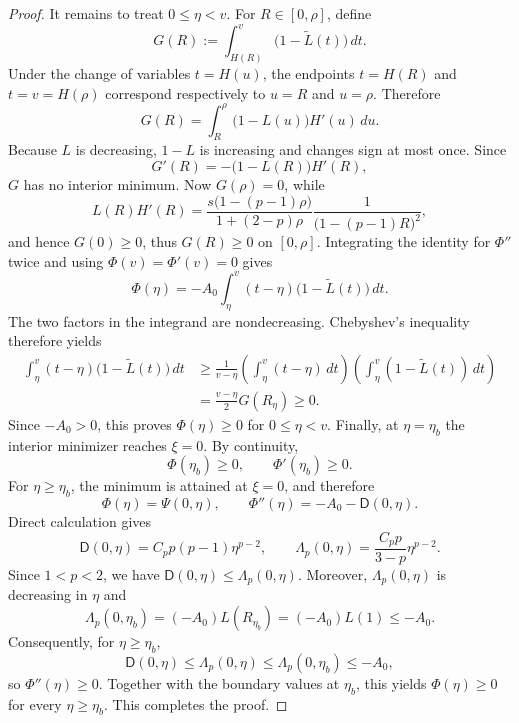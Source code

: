 \documentclass[10pt,a4paper]{amsart}
\begin{document}
\begin{proof}
It remains to treat $0\leq\eta<v$. For $R\in[0,\rho]$, define
\[
G(R):=\int_{H(R)}^v\bigl(1-\widetilde L(t)\bigr)\,dt.
\]
Under the change of variables $t=H(u)$, the endpoints $t=H(R)$ and $t=v=H(\rho)$ correspond respectively to $u=R$ and $u=\rho$. Therefore
\[
G(R)=\int_R^\rho\bigl(1-L(u)\bigr)H'(u)\,du.
\]
Because $L$ is decreasing, $1-L$ is increasing and changes sign at most
once. Since
\[
G'(R)=-\bigl(1-L(R)\bigr)H'(R),
\]
$G$ has no interior minimum. Now $G(\rho)=0$, while
\[
L(R)H'(R)
=\frac{s\bigl(1-(p-1)\rho\bigr)}{1+(2-p)\rho}
\frac1{\bigl(1-(p-1)R\bigr)^2},
\]
and hence $G(0)\geq0$, thus $G(R)\geq0$ on $[0,\rho]$. Integrating the identity for $\Phi''$ twice and using $\Phi(v)=\Phi'(v)=0$ gives
\[
\Phi(\eta)
=-A_0\int_\eta^v(t-\eta)\bigl(1-\widetilde L(t)\bigr)\,dt.
\]
The two factors in the integrand are nondecreasing. Chebyshev's
inequality therefore yields
\begin{align*}
\int_\eta^v(t-\eta)\bigl(1-\widetilde L(t)\bigr)\,dt
&\geq\frac1{v-\eta}
\left(\int_\eta^v(t-\eta)\,dt\right)
\left(\int_\eta^v(1-\widetilde L(t))\,dt\right)\\
&=\frac{v-\eta}2G(R_\eta)\geq0.
\end{align*}
Since $-A_0>0$, this proves $\Phi(\eta)\geq0$ for $0\leq\eta<v$. Finally, at $\eta=\eta_b$ the interior minimizer reaches $\xi=0$.
By continuity,
\[
\Phi(\eta_b)\geq0,
\qquad \Phi'(\eta_b)\geq0.
\]
For $\eta\geq\eta_b$, the minimum is attained at $\xi=0$, and therefore
\[
\Phi(\eta)=\Psi(0,\eta),
\qquad \Phi''(\eta)=-A_0-\mathsf D(0,\eta).
\]
Direct calculation gives
\[
\mathsf D(0,\eta)=C_pp(p-1)\eta^{p-2},
\qquad
\Lambda_p(0,\eta)=\frac{C_pp}{3-p}\eta^{p-2}.
\]
Since $1<p<2$, we have
$\mathsf D(0,\eta)\leq\Lambda_p(0,\eta)$. Moreover,
$\Lambda_p(0,\eta)$ is decreasing in $\eta$ and
\[
\Lambda_p(0,\eta_b)=(-A_0)L(R_{\eta_b})=(-A_0)L(1)\leq-A_0.
\]
Consequently, for $\eta\geq\eta_b$,
\[
\mathsf D(0,\eta)
\leq\Lambda_p(0,\eta)
\leq\Lambda_p(0,\eta_b)
\leq-A_0,
\]
so $\Phi''(\eta)\geq0$. Together with the boundary values at $\eta_b$,
this yields $\Phi(\eta)\geq0$ for every $\eta\geq\eta_b$. This completes the proof.
\end{proof}
\end{document}
